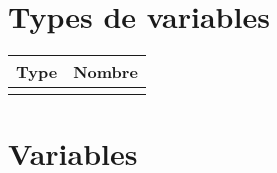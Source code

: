 \documentclass[a4paper,]{article}
\begin{document}
\hypertarget{types-de-variables}{%
\section{Types de variables}\label{types-de-variables}}

\begin{tabu} to 
\hline
Type & Nombre\\
\hline
{} & \\
\hline
\end{tabu}

\pagebreak

\hypertarget{variables}{%
\section{Variables}\label{variables}}
\end{document}
